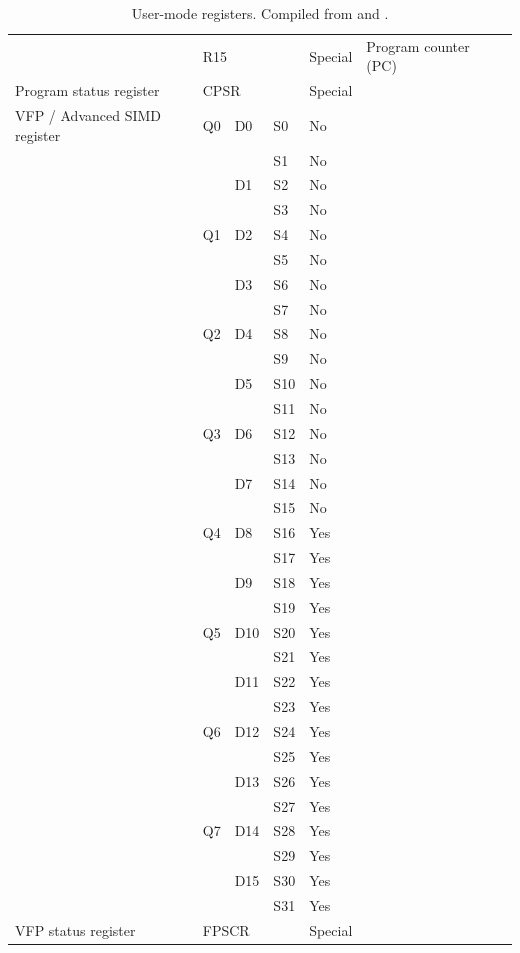 \documentclass[oneside,a4paper]{article}
\begin{document}
\begin{table}[htbp]
\begin{tabular}{lllllll}
							 		&	\multicolumn{3}{l}{R15}		&	Special		&	Program counter (PC) 		\\
		Program status register		&	\multicolumn{3}{l}{CPSR}	&	Special		&						 		\\
		VFP / Advanced SIMD register&	Q0	&	D0	&	S0			&	No			&	  		\\
									&		&		&	S1			&	No			&	  		\\
									&		&	D1	&	S2			&	No			&	  		\\
									&		&		&	S3			&	No			&	  		\\
									&	Q1	&	D2	&	S4			&	No			&	  		\\
									&		&		&	S5			&	No			&	  		\\
									&		&	D3	&	S6			&	No			&	  		\\
									&		&		&	S7			&	No			&	  		\\
									&	Q2	&	D4	&	S8			&	No			&	  		\\
									&		&		&	S9			&	No			&	  		\\
									&		&	D5	&	S10			&	No			&	  		\\
									&		&		&	S11			&	No			&	  		\\
									&	Q3	&	D6	&	S12			&	No			&	  		\\
									&		&		&	S13			&	No			&	  		\\
									&		&	D7	&	S14			&	No			&	  		\\
									&		&		&	S15			&	No			&	  		\\
									&	Q4	&	D8	&	S16			&	Yes			&	  		\\
									&		&		&	S17			&	Yes			&	  		\\
									&		&	D9	&	S18			&	Yes			&	  		\\
									&		&		&	S19			&	Yes			&	  		\\
									&	Q5	&	D10	&	S20			&	Yes			&	  		\\
									&		&		&	S21			&	Yes			&	  		\\
									&		&	D11	&	S22			&	Yes			&	  		\\
									&		&		&	S23			&	Yes			&	  		\\
									&	Q6	&	D12	&	S24			&	Yes			&	  		\\
									&		&		&	S25			&	Yes			&	  		\\
									&		&	D13	&	S26			&	Yes			&	  		\\
									&		&		&	S27			&	Yes			&	  		\\
									&	Q7	&	D14	&	S28			&	Yes			&	  		\\
									&		&		&	S29			&	Yes			&	  		\\
									&		&	D15	&	S30			&	Yes			&	  		\\
									&		&		&	S31			&	Yes			&	  		\\
		VFP status register			&	\multicolumn{3}{l}{FPSCR}	&	Special		&						 		\\
		\bottomrule
	\end{tabular}
	\caption{User-mode registers. Compiled from \cite[p. 15]{AAPCS} and \cite[p. 14--15]{iOSABI}.}
	\label{tab:registers}
\end{table}
\end{document}
